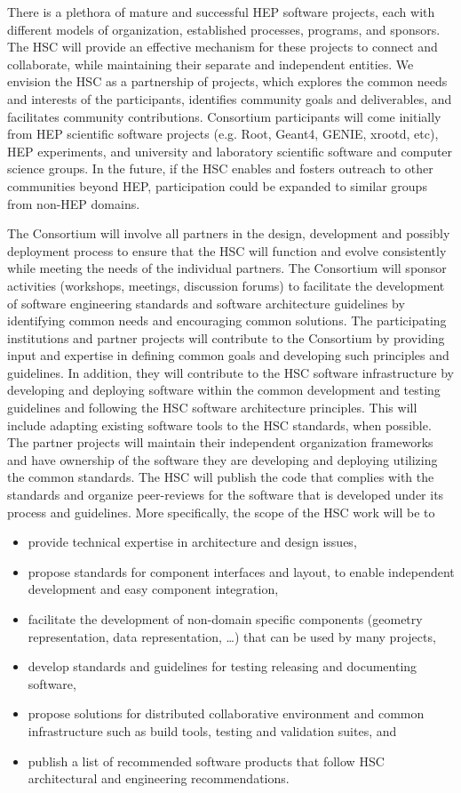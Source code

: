 \documentclass[12pt,letterpaper,fleqn]{article}
\begin{document}
There is a plethora of mature and successful HEP software projects,
each with different models of organization, established processes,
programs, and sponsors.  The HSC will provide an effective mechanism
for these projects to connect and collaborate, while maintaining
their separate and independent entities.  We envision the HSC as a
partnership of projects, which explores the common needs and interests
of the participants, identifies community goals and deliverables,
and facilitates community contributions. Consortium participants
will come initially from HEP scientific software projects (e.g.
Root, Geant4, GENIE, xrootd, etc), HEP experiments, and university and
laboratory scientific software and computer science groups.  In the
future, if the HSC enables and fosters outreach to other communities
beyond HEP, participation could be expanded to similar groups from
non-HEP domains.

The Consortium will involve all partners in the design, development
and possibly deployment process to ensure that the HSC will function
and evolve consistently while meeting the needs of the individual
partners.  The Consortium will sponsor activities (workshops,
meetings, discussion forums) to facilitate the development of
software engineering standards and software architecture guidelines
by identifying common needs and encouraging common solutions. The
participating institutions and partner projects will contribute to
the Consortium by providing input and expertise in defining common
goals and developing such principles and guidelines.  In addition,
they will contribute to the HSC software infrastructure by developing
and deploying software within the common development and testing
guidelines and following the HSC software architecture principles.
This will include adapting existing software tools to the HSC
standards, when possible.  The partner projects will maintain their
independent organization frameworks and have ownership of the
software they are developing and deploying utilizing the common
standards.  The HSC will publish the code that complies with the
standards and organize peer-reviews for the software that is developed
under its process and guidelines.  More specifically, the scope of
the HSC work will be to
\begin{itemize}
\item provide technical expertise in architecture and design issues,
\item propose standards for component interfaces and layout, to
enable independent development and easy component integration,
\item facilitate the development of non-domain specific components
(geometry representation, data representation, …) that can be used
by many projects,
\item develop standards and guidelines for testing releasing and
documenting software,
\item propose solutions for distributed collaborative environment
and common infrastructure such as build tools, testing and validation
suites, and
\item publish a list of recommended software products that follow HSC
architectural and engineering recommendations.
\end{itemize}
\end{document}
